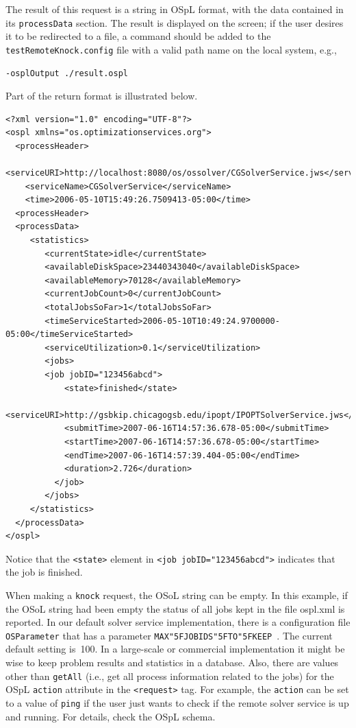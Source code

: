 \documentclass[11pt]{article}
\renewcommand{\_}{{\char"5F}}
\renewcommand{\{}{{\char"7B}}
\renewcommand{\}}{{\char"7D}}
\renewcommand{\^}{{\char"0D}}
\renewcommand{\'}{{\char"0D}}
\begin{document}
\begin{enumerate}[Step 1:]
The result of this request is a string in OSpL format, with the data contained in its 
{\tt processData} section.  The result is displayed on the screen; if the user desires it
to be redirected to a file, a command should be added to the {\tt testRemoteKnock.config}
file with a valid path name on the local system, e.g.,

\begin{verbatim}
-osplOutput ./result.ospl
\end{verbatim}

Part of the return format is illustrated below.

\begin{verbatim}
<?xml version="1.0" encoding="UTF-8"?>
<ospl xmlns="os.optimizationservices.org">
  <processHeader>
    <serviceURI>http://localhost:8080/os/ossolver/CGSolverService.jws</serviceURI>
    <serviceName>CGSolverService</serviceName>
    <time>2006-05-10T15:49:26.7509413-05:00</time>
  <processHeader>
  <processData>
     <statistics>
        <currentState>idle</currentState>
        <availableDiskSpace>23440343040</availableDiskSpace>
        <availableMemory>70128</availableMemory>
        <currentJobCount>0</currentJobCount>
        <totalJobsSoFar>1</totalJobsSoFar>
        <timeServiceStarted>2006-05-10T10:49:24.9700000-05:00</timeServiceStarted>
        <serviceUtilization>0.1</serviceUtilization>
        <jobs>
        <job jobID="123456abcd">
            <state>finished</state>
            <serviceURI>http://gsbkip.chicagogsb.edu/ipopt/IPOPTSolverService.jws</serviceURI>
            <submitTime>2007-06-16T14:57:36.678-05:00</submitTime>
            <startTime>2007-06-16T14:57:36.678-05:00</startTime>
            <endTime>2007-06-16T14:57:39.404-05:00</endTime>
            <duration>2.726</duration>
          </job>
        </jobs>
     </statistics>
  </processData>
</ospl>
\end{verbatim}
Notice that the {\tt <state>} element in {\tt <job jobID="123456abcd">} indicates that the job is finished.

When making a {\tt knock} request,  the OSoL string can be empty. In this example, if the OSoL string had been empty 
the status of all jobs kept in the file ospl.xml is reported.  In our default solver service implementation, 
there is a configuration file {\tt OSParameter} that has a parameter {\tt MAX\_JOBIDS\_TO\_KEEP }.  
The current default setting is~100. In a large-scale or commercial implementation it might be wise to keep 
problem results and statistics in a database. Also, there are values other than {\tt getAll} (i.e., get all 
process information related to the jobs) for the OSpL {\tt action} attribute in the {\tt <request>} tag.  
For example, the {\tt action} can be set to a value of {\tt ping} if the user just wants 
to check if the remote solver service is up and running. For details, check the OSpL schema.



\end{enumerate}
\end{document}
